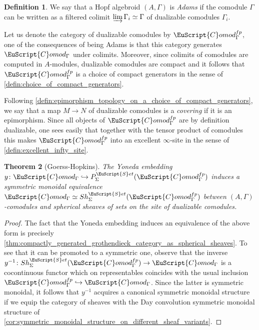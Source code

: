 \documentclass[oneside,a4paper]{amsart}
\newcommand{\euscr}[1]{\EuScript{#1}} %
\newcommand{\sets}{\euscr{S}et} %
\newcommand{\Comod}{\euscr{C}omod} %
\newcommand{\ComodGamma}{\Comod_{\Gamma}} %
\theoremstyle{plain}
\newtheorem{thm}{Theorem}[section]
\theoremstyle{definition}
\newtheorem{defin}[thm]{Definition}
\theoremstyle{remark}
\begin{document}
\begin{defin}
\label{defin:adams_hopf_algebroid}
We say that a Hopf algebroid $(A, \Gamma)$ is \emph{Adams} if the comodule $\Gamma$ can be written as a filtered colimit $\varinjlim \Gamma_{i} \simeq \Gamma$ of dualizable comodules $\Gamma_{i}$.
\end{defin}

Let us denote the category of dualizable comodules by $\ComodGamma^{fp}$, one of the consequences of being Adams is that this category generates $\ComodGamma$ under colimits. Moreover, since  colimits of comodules are computed in $A$-modules, dualizable comodules are compact and it follows that $\ComodGamma^{fp}$ is a choice of compact generators in the sense of \cref{defin:choice_of_compact_generators}.

Following \cref{defin:epimorphism_topology_on_a_choice_of_compact_generators}, we say that a map $M \rightarrow N$ of dualizable comodules is a \emph{covering} if it is an epimorphism. Since all objects of $\ComodGamma^{fp}$ are by definition dualizable, one sees easily that together with the tensor product of comodules this makes $\ComodGamma^{fp}$ into an excellent $\infty$-site in the sense of \cref{defin:excellent_infty_site}. 

\begin{thm}[Goerss-Hopkins]
\label{thm:equivalence_of_comodules_with_spherical_sheaves}
The Yoneda embedding $y \colon \ComodGamma \hookrightarrow P_{\Sigma}^{\sets}(\ComodGamma^{fp})$ induces a symmetric monoidal equivalence $\ComodGamma \simeq Sh_{\Sigma}^{\sets}(\ComodGamma^{fp})$ between $(A, \Gamma)$-comodules and spherical sheaves of sets on the site of dualizable comodules.
\end{thm}

\begin{proof}
The fact that the Yoneda embedding induces an equivalence of the above form is precisely \cref{thm:compactly_generated_grothendieck_category_as_spherical_sheaves}. To see that it can be promoted to a symmetric one, observe that the inverse $y^{-1} \colon Sh_{\Sigma}^{\sets}(\ComodGamma^{fp}) \rightarrow \ComodGamma$ is a cocontinuous functor which on representables coincides with the usual inclusion $\ComodGamma^{fp} \hookrightarrow \ComodGamma$. Since the latter is symmetric monoidal, it follows that $y^{-1}$ acquires a canonical symmetric monoidal structure if we equip the category of sheaves with the Day convolution symmetric monoidal structure of  \cref{cor:symmetric_monoidal_structure_on_different_sheaf_variants}. 
\end{proof}
\end{document}
